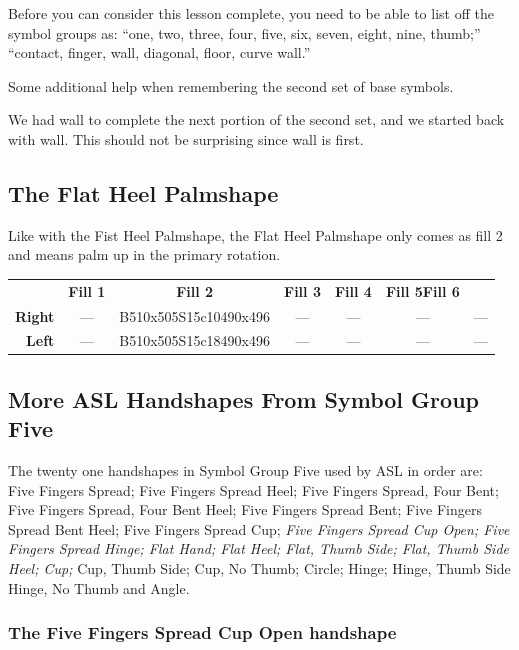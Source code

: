 \documentclass{article}
\begin{document}
Before you can consider this lesson complete, you need to be able to list off the symbol groups as:
``one, two, three, four, five, six, seven, eight, nine, thumb;''
``contact, finger, wall, diagonal, floor, curve wall.''

Some additional help when remembering the second set of base symbols.

We had wall to complete the next portion of the second set, and we started back with wall.
This should not be surprising since wall is first.

\subsection{The Flat Heel Palmshape}

Like with the Fist Heel Palmshape, the Flat Heel Palmshape only comes as fill 2 and means palm up in the primary rotation.

\begin{center}
\begin{tabular}{r*{6}{c}}
&\textbf{Fill 1}&\textbf{Fill 2}&\textbf{Fill 3}&\textbf{Fill 4}&\textbf{Fill 5}\textbf{Fill 6}\\
\textbf{Right}&---&B510x505S15c10490x496&---&---&---&---\\
\textbf{Left} &---&B510x505S15c18490x496&---&---&---&---\\
\end{tabular}
\end{center}

\subsection{More ASL Handshapes From Symbol Group Five}

The twenty one handshapes in Symbol Group Five used by ASL in order are:
Five Fingers Spread;
Five Fingers Spread Heel;
Five Fingers Spread, Four Bent;
Five Fingers Spread, Four Bent Heel;
Five Fingers Spread Bent;
Five Fingers Spread Bent Heel;
Five Fingers Spread Cup;
{\it
Five Fingers Spread Cup Open;
Five Fingers Spread Hinge;
Flat Hand;
Flat Heel;
Flat, Thumb Side;
Flat, Thumb Side Heel;
Cup;
}
Cup, Thumb Side;
Cup, No Thumb;
Circle;
Hinge;
Hinge, Thumb Side
Hinge, No Thumb
and Angle.

\subsubsection{The Five Fingers Spread Cup Open handshape}
\end{document}
